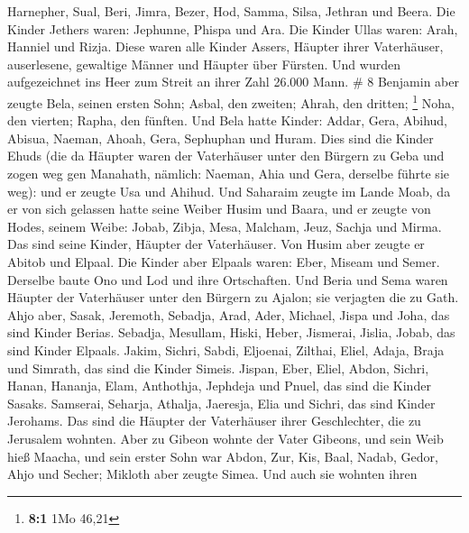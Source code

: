 Harnepher, Sual, Beri, Jimra,  Bezer, Hod, Samma, Silsa,
Jethran und Beera.  Die Kinder Jethers waren: Jephunne,
Phispa und Ara.  Die Kinder Ullas waren: Arah, Hanniel
und Rizja.  Diese waren alle Kinder Assers, Häupter ihrer
Vaterhäuser, auserlesene, gewaltige Männer und Häupter über Fürsten. Und
wurden aufgezeichnet ins Heer zum Streit an ihrer Zahl 26.000 Mann. \# 8
 Benjamin aber zeugte Bela, seinen ersten Sohn; Asbal, den
zweiten; Ahrah, den dritten; \footnote{\textbf{8:1} 1Mo 46,21}
 Noha, den vierten; Rapha, den fünften.  Und
Bela hatte Kinder: Addar, Gera, Abihud,  Abisua, Naeman,
Ahoah,  Gera, Sephuphan und Huram.  Dies
sind die Kinder Ehuds (die da Häupter waren der Vaterhäuser unter den
Bürgern zu Geba und zogen weg gen Manahath,  nämlich:
Naeman, Ahia und Gera, derselbe führte sie weg): und er zeugte Usa und
Ahihud.  Und Saharaim zeugte im Lande Moab, da er von sich
gelassen hatte seine Weiber Husim und Baara,  und er
zeugte von Hodes, seinem Weibe: Jobab, Zibja, Mesa, Malcham,
 Jeuz, Sachja und Mirma. Das sind seine Kinder, Häupter
der Vaterhäuser.  Von Husim aber zeugte er Abitob und
Elpaal.  Die Kinder aber Elpaals waren: Eber, Miseam und
Semer. Derselbe baute Ono und Lod und ihre Ortschaften. 
Und Beria und Sema waren Häupter der Vaterhäuser unter den Bürgern zu
Ajalon; sie verjagten die zu Gath.  Ahjo aber, Sasak,
Jeremoth,  Sebadja, Arad, Ader,  Michael,
Jispa und Joha, das sind Kinder Berias.  Sebadja,
Mesullam, Hiski, Heber,  Jismerai, Jislia, Jobab, das
sind Kinder Elpaals.  Jakim, Sichri, Sabdi,
 Eljoenai, Zilthai, Eliel,  Adaja, Braja
und Simrath, das sind die Kinder Simeis.  Jispan, Eber,
Eliel,  Abdon, Sichri, Hanan,  Hananja,
Elam, Anthothja,  Jephdeja und Pnuel, das sind die Kinder
Sasaks.  Samserai, Seharja, Athalja, 
Jaeresja, Elia und Sichri, das sind Kinder Jerohams.  Das
sind die Häupter der Vaterhäuser ihrer Geschlechter, die zu Jerusalem
wohnten.  Aber zu Gibeon wohnte der Vater Gibeons, und
sein Weib hieß Maacha,  und sein erster Sohn war Abdon,
Zur, Kis, Baal, Nadab,  Gedor, Ahjo und Secher;
 Mikloth aber zeugte Simea. Und auch sie wohnten ihren
